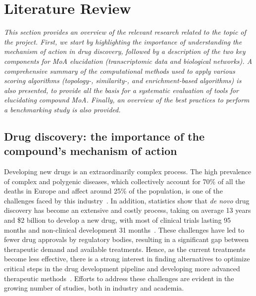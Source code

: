 
%

\chapter{Literature Review}
\label{cha:literature_review}

\textit{This section provides an overview of the relevant research related to the topic of the project. 
First, we start by highlighting the importance of understanding the mechanism of action in drug discovery, followed by a description of the two key components for MoA elucidation (transcriptomic data and biological networks). 
A comprehensive summary of the computational methods used to apply various scoring algorithms (topology-, similarity-, and enrichment-based algorithms) is also presented, to provide all the basis for a systematic evaluation of tools for elucidating compound MoA. 
Finally, an overview of the best practices to perform a benchmarking study is also provided.}

\section{Drug discovery: the importance of the compound's mechanism of action} %
\label{sec:drug_discovery_the_importance_of_the_compounds_mechanism_of_action}

Developing new drugs is an extraordinarily complex process. 
The high prevalence of complex and polygenic diseases, which collectively account for 70\% of all the deaths in Europe and affect around 25\% of the population, is one of the challenges faced by this industry~\cite{RN43}. 
In addition, statistics show that \textit{de novo} drug discovery has become an extensive and costly process, taking on average 13 years and \$2 billion to develop a new drug, with most of clinical trials lasting 95 months and non-clinical development 31 months~\cite{RN55,RN56,RN47}. 
These challenges have led to fewer drug approvals by regulatory bodies, resulting in a significant gap between therapeutic demand and available treatments. Hence, as the current treatments become less effective, there is a strong interest in finding alternatives to optimize critical steps in the drug development pipeline and developing more advanced therapeutic methods~\cite{RN44}. 
Efforts to address these challenges are evident in the growing number of studies, both in industry and academia.

